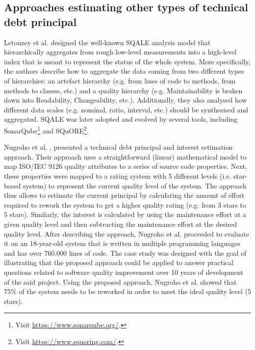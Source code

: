 \subsection{Approaches estimating other types of technical debt principal}\label{c6:sec:related-work-td}
Letouzey et al. \cite{Letouzey2010} designed the well-known SQALE analysis model that hierarchically aggregates from rough low-level measurements into a high-level index that is meant to represent the status of the whole system.
More specifically, the authors describe how to aggregate the data coming from two different types of hierarchies: an artefact hierarchy (e.g. from lines of code to methods, from methods to classes, etc.) and a quality hierarchy (e.g. Maintainability is broken down into Readability, Changeability, etc.).
Additionally, they also analysed how different data scales (e.g. nominal, ratio, interval, etc.) should be synthesised and aggregated.
SQALE was later adopted and evolved by several tools, including SonarQube\footnote{Visit \url{https://www.sonarqube.org/}.} and SQuORE\footnote{Visit \url{https://www.squoring.com/}.}.

Nugroho et al. \cite{Nugroho2011}, presented a technical debt principal and interest estimation approach.
Their approach uses a straightforward (linear) mathematical model to map ISO/IEC 9126 quality attributes to a series of source code properties.
Next, these properties were mapped to a rating system with 5 different levels (i.e. star-based system) to represent the current quality level of the system.
The approach thus allows to estimate the current principal by calculating the amount of effort required to rework the system to get a higher quality rating (e.g. from 3 stars to 5 stars).
Similarly, the interest is calculated by using the maintenance effort at a given quality level and then subtracting the maintenance effort at the desired quality level.
After describing the approach, Nugroho et al. proceeded to evaluate it on an 18-year-old system that is written in multiple programming languages and has over 760.000 lines of code.
The case study was designed with the goal of illustrating that the proposed approach could be applied to answer practical questions related to software quality improvement over 10 years of development of the said project.
Using the proposed approach, Nugroho et al. showed that 75\% of the system needs to be reworked in order to meet the ideal quality level (5 stars).

